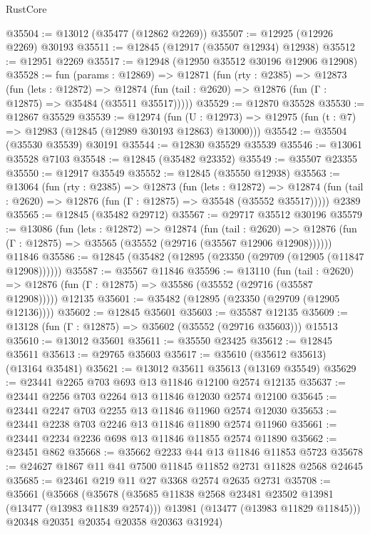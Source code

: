 \begin{lexlean}{RustCore}
\begin{coremodule}
@35504 := @13012 (@35477 (@12862 @2269))
@35507 := @12925 (@12926 @2269) @30193
@35511 := @12845 (@12917 (@35507 @12934) @12938)
@35512 := @12951 @2269
@35517 := @12948 (@12950 @35512 @30196 @12906 @12908)
@35528 := fun (params : @12869) =>
  @12871
    (fun (rty : @2385) =>
    @12873
      (fun (lets : @12872) =>
      @12874 (fun (tail : @2620) => @12876 (fun (Γ : @12875) => @35484 (@35511 @35517)))))
@35529 := @12870 @35528
@35530 := @12867 @35529
@35539 := @12974
    (fun (U : @12973) => @12975 (fun (t : @7) => @12983 (@12845 (@12989 @30193 @12863) @13000)))
@35542 := @35504 (@35530 @35539) @30191
@35544 := @12830 @35529 @35539
@35546 := @13061 @35528 @7103
@35548 := @12845 (@35482 @23352)
@35549 := @35507 @23355
@35550 := @12917 @35549
@35552 := @12845 (@35550 @12938)
@35563 := @13064
    (fun (rty : @2385) =>
    @12873
      (fun (lets : @12872) =>
      @12874 (fun (tail : @2620) => @12876 (fun (Γ : @12875) => @35548 (@35552 @35517)))))
    @2389
@35565 := @12845 (@35482 @29712)
@35567 := @29717 @35512 @30196
@35579 := @13086
    (fun (lets : @12872) =>
    @12874
      (fun (tail : @2620) =>
      @12876 (fun (Γ : @12875) => @35565 (@35552 (@29716 (@35567 @12906 @12908))))))
    @11846
@35586 := @12845 (@35482 (@12895 (@23350 (@29709 (@12905 (@11847 @12908))))))
@35587 := @35567 @11846
@35596 := @13110
    (fun (tail : @2620) => @12876 (fun (Γ : @12875) => @35586 (@35552 (@29716 (@35587 @12908)))))
    @12135
@35601 := @35482 (@12895 (@23350 (@29709 (@12905 @12136))))
@35602 := @12845 @35601
@35603 := @35587 @12135
@35609 := @13128 (fun (Γ : @12875) => @35602 (@35552 (@29716 @35603))) @15513
@35610 := @13012 @35601
@35611 := @35550 @23425
@35612 := @12845 @35611
@35613 := @29765 @35603
@35617 := @35610 (@35612 @35613) (@13164 @35481)
@35621 := @13012 @35611 @35613 (@13169 @35549)
@35629 := @23441 @2265 @703 @693 @13 @11846 @12100 @2574 @12135
@35637 := @23441 @2256 @703 @2264 @13 @11846 @12030 @2574 @12100
@35645 := @23441 @2247 @703 @2255 @13 @11846 @11960 @2574 @12030
@35653 := @23441 @2238 @703 @2246 @13 @11846 @11890 @2574 @11960
@35661 := @23441 @2234 @2236 @698 @13 @11846 @11855 @2574 @11890
@35662 := @23451 @862
@35668 := @35662 @2233 @44 @13 @11846 @11853 @5723
@35678 := @24627 @1867 @11 @41 @7500 @11845 @11852 @2731 @11828 @2568 @24645
@35685 := @23461 @219 @11 @27 @3368 @2574 @2635 @2731
@35708 := @35661
    (@35668
      (@35678
        (@35685 @11838 @2568 @23481 @23502 @13981 (@13477 (@13983 @11839 @2574)))
        @13981
        (@13477 (@13983 @11829 @11845)))
      @20348
      @20351
      @20354
      @20358
      @20363
      @31924)

\end{coremodule}
\end{lexlean}
